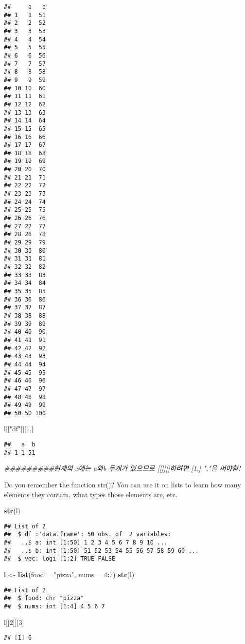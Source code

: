 \documentclass[
]{article}
\newenvironment{Shaded}{\begin{snugshade}}{\end{snugshade}}
\newcommand{\CommentTok}[1]{\textcolor[rgb]{0.56,0.35,0.01}{\textit{#1}}}
\newcommand{\DataTypeTok}[1]{\textcolor[rgb]{0.13,0.29,0.53}{#1}}
\newcommand{\DecValTok}[1]{\textcolor[rgb]{0.00,0.00,0.81}{#1}}
\newcommand{\KeywordTok}[1]{\textcolor[rgb]{0.13,0.29,0.53}{\textbf{#1}}}
\newcommand{\NormalTok}[1]{#1}
\newcommand{\OperatorTok}[1]{\textcolor[rgb]{0.81,0.36,0.00}{\textbf{#1}}}
\newcommand{\StringTok}[1]{\textcolor[rgb]{0.31,0.60,0.02}{#1}}
\begin{document}
\begin{verbatim}
##     a   b
## 1   1  51
## 2   2  52
## 3   3  53
## 4   4  54
## 5   5  55
## 6   6  56
## 7   7  57
## 8   8  58
## 9   9  59
## 10 10  60
## 11 11  61
## 12 12  62
## 13 13  63
## 14 14  64
## 15 15  65
## 16 16  66
## 17 17  67
## 18 18  68
## 19 19  69
## 20 20  70
## 21 21  71
## 22 22  72
## 23 23  73
## 24 24  74
## 25 25  75
## 26 26  76
## 27 27  77
## 28 28  78
## 29 29  79
## 30 30  80
## 31 31  81
## 32 32  82
## 33 33  83
## 34 34  84
## 35 35  85
## 36 36  86
## 37 37  87
## 38 38  88
## 39 39  89
## 40 40  90
## 41 41  91
## 42 42  92
## 43 43  93
## 44 44  94
## 45 45  95
## 46 46  96
## 47 47  97
## 48 48  98
## 49 49  99
## 50 50 100
\end{verbatim}

\begin{Shaded}
\begin{Highlighting}[]
\NormalTok{l[[}\StringTok{"df"}\NormalTok{]][}\DecValTok{1}\NormalTok{,]}
\end{Highlighting}
\end{Shaded}

\begin{verbatim}
##   a  b
## 1 1 51
\end{verbatim}

\begin{Shaded}
\begin{Highlighting}[]
\CommentTok{#########현재의 x에는 a와b 두개가 있으므로 [[]][]하려면 [1,] ","을 써야함!}
\end{Highlighting}
\end{Shaded}

Do you remember the function str()? You can use it on lists to learn how
many elements they contain, what types those elements are, etc.

\begin{Shaded}
\begin{Highlighting}[]
\KeywordTok{str}\NormalTok{(l)}
\end{Highlighting}
\end{Shaded}

\begin{verbatim}
## List of 2
##  $ df :'data.frame': 50 obs. of  2 variables:
##   ..$ a: int [1:50] 1 2 3 4 5 6 7 8 9 10 ...
##   ..$ b: int [1:50] 51 52 53 54 55 56 57 58 59 60 ...
##  $ vec: logi [1:2] TRUE FALSE
\end{verbatim}

\begin{Shaded}
\begin{Highlighting}[]
\NormalTok{l <-}\StringTok{ }\KeywordTok{list}\NormalTok{(}\DataTypeTok{food =} \StringTok{"pizza"}\NormalTok{, }\DataTypeTok{nums =} \DecValTok{4}\OperatorTok{:}\DecValTok{7}\NormalTok{)}
\KeywordTok{str}\NormalTok{(l)}
\end{Highlighting}
\end{Shaded}

\begin{verbatim}
## List of 2
##  $ food: chr "pizza"
##  $ nums: int [1:4] 4 5 6 7
\end{verbatim}

\begin{Shaded}
\begin{Highlighting}[]
\NormalTok{l[[}\DecValTok{2}\NormalTok{]][}\DecValTok{3}\NormalTok{]}
\end{Highlighting}
\end{Shaded}

\begin{verbatim}
## [1] 6
\end{verbatim}
\end{document}
